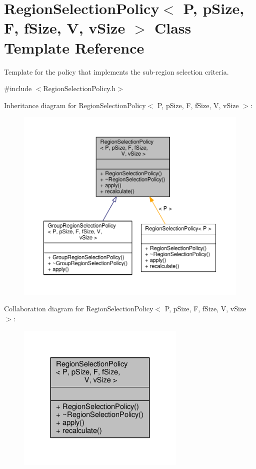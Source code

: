\hypertarget{classRegionSelectionPolicy}{}\section{Region\+Selection\+Policy$<$ P, p\+Size, F, f\+Size, V, v\+Size $>$ Class Template Reference}
\label{classRegionSelectionPolicy}


Template for the policy that implements the sub-\/region selection criteria.  




{\ttfamily \#include $<$Region\+Selection\+Policy.\+h$>$}



Inheritance diagram for Region\+Selection\+Policy$<$ P, p\+Size, F, f\+Size, V, v\+Size $>$\+:\nopagebreak
\begin{figure}[H]
\begin{center}
\leavevmode
\includegraphics[width=350pt]{classRegionSelectionPolicy__inherit__graph}
\end{center}
\end{figure}


Collaboration diagram for Region\+Selection\+Policy$<$ P, p\+Size, F, f\+Size, V, v\+Size $>$\+:\nopagebreak
\begin{figure}[H]
\begin{center}
\leavevmode
\includegraphics[width=228pt]{classRegionSelectionPolicy__coll__graph}
\end{center}
\end{figure}
